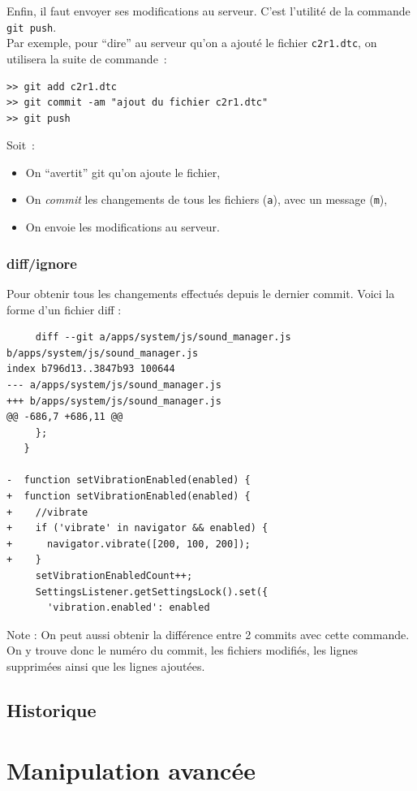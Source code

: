 \documentclass[a4paper,10pt]{report}
\begin{document}
Enfin, il faut envoyer ses modifications au serveur. C'est l'utilit\'e de la commande \verb|git push|. \\

Par exemple, pour ``dire'' au serveur qu'on a ajout\'e le fichier \verb|c2r1.dtc|, on utilisera la suite de commande~:
\begin{verbatim}
>> git add c2r1.dtc
>> git commit -am "ajout du fichier c2r1.dtc"
>> git push
\end{verbatim}

Soit~:
\begin{itemize}
 \item On ``avertit'' git qu'on ajoute le fichier,
 \item On \emph{commit} les changements de tous les fichiers (\verb|a|), avec un message (\verb|m|),
 \item On envoie les modifications au serveur.
\end{itemize}


     \subsection{diff/ignore}
Pour obtenir tous les changements effectués depuis le dernier commit. Voici la forme d'un fichier diff :
\begin{verbatim}
     diff --git a/apps/system/js/sound_manager.js b/apps/system/js/sound_manager.js
index b796d13..3847b93 100644
--- a/apps/system/js/sound_manager.js
+++ b/apps/system/js/sound_manager.js
@@ -686,7 +686,11 @@
     };
   }
 
-  function setVibrationEnabled(enabled) {
+  function setVibrationEnabled(enabled) {    
+    //vibrate
+    if ('vibrate' in navigator && enabled) {
+      navigator.vibrate([200, 100, 200]);
+    }
     setVibrationEnabledCount++;
     SettingsListener.getSettingsLock().set({
       'vibration.enabled': enabled
\end{verbatim}   
Note : On peut aussi obtenir la différence entre 2 commits avec cette commande. \\
On y trouve donc le numéro du commit, les fichiers modifiés, les lignes supprimées ainsi que les lignes ajoutées.
  \section{Historique}
\chapter{Manipulation avancée}
\end{document}
